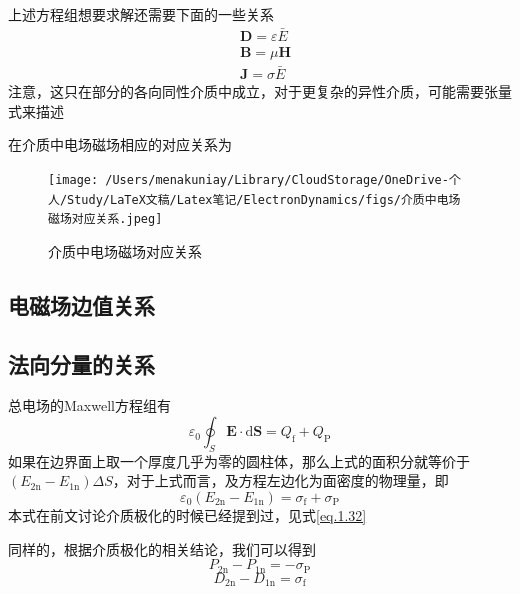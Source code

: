 		上述方程组想要求解还需要下面的一些关系
		\begin{equation}
			\begin{aligned}
			&\boldsymbol{D}=\varepsilon \bar{E} \\
			&\boldsymbol{B}=\mu \boldsymbol{H} \\
			&\boldsymbol{J}=\sigma \bar{E}
			\end{aligned}
		\end{equation}
		注意，这只在部分的各向同性介质中成立，对于更复杂的异性介质，可能需要张量式来描述
		\vspace*{2em}

		在介质中电场磁场相应的对应关系为
		
		\begin{figure}[H]
						\centering  %
						\texttt{[image: /Users/menakuniay/Library/CloudStorage/OneDrive-个人/Study/LaTeX文稿/Latex笔记/ElectronDynamics/figs/介质中电场磁场对应关系.jpeg]}
						\caption{介质中电场磁场对应关系} %
						\label{fig.介质中电场磁场对应关系}
						\end{figure}
	\subsection{电磁场边值关系}
		\subsection{法向分量的关系}
			总电场的Maxwell方程组有
				\begin{equation}
					\varepsilon_{0} \oint_{S} \boldsymbol{E} \cdot \mathrm{d} \boldsymbol{S}=Q_{\mathrm{f}}+Q_{\mathrm{P}}
				\end{equation}
			如果在边界面上取一个厚度几乎为零的圆柱体，那么上式的面积分就等价于$\left(E_{2 \mathrm{n}}-E_{1 \mathrm{n}}\right) \Delta S$，对于上式而言，及方程左边化为面密度的物理量，即
				\begin{equation}
					\varepsilon_{0}\left(E_{2 \mathrm{n}}-E_{1 \mathrm{n}}\right)=\sigma_{\mathrm{f}}+\sigma_{\mathrm{P}}
				\end{equation}
			本式在前文讨论介质极化的时候已经提到过，见式\ref{eq.1.32}

			同样的，根据介质极化的相关结论，我们可以得到
			\begin{equation}
				P_{2 \mathrm{n}}-P_{1 \mathrm{n}}=-\sigma_{\mathrm{P}}
			\end{equation}
			\begin{equation}
				D_{2 \mathrm{n}}-D_{1 \mathrm{n}}=\sigma_{\mathrm{f}}
			\end{equation}

